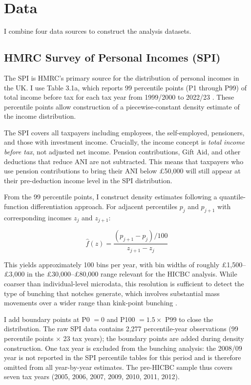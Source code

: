 \documentclass[12pt]{article}
\begin{document}
\section{Data}

I combine four data sources to construct the analysis datasets.

\subsection{HMRC Survey of Personal Incomes (SPI)}

The SPI is HMRC's primary source for the distribution of personal incomes in the UK. I use Table 3.1a, which reports 99 percentile points (P1 through P99) of total income before tax for each tax year from 1999/2000 to 2022/23 \citep{hmrc_spi2024}. These percentile points allow construction of a piecewise-constant density estimate of the income distribution.

The SPI covers all taxpayers including employees, the self-employed, pensioners, and those with investment income. Crucially, the income concept is \emph{total income before tax}, not adjusted net income. Pension contributions, Gift Aid, and other deductions that reduce ANI are not subtracted. This means that taxpayers who use pension contributions to bring their ANI below \pounds50,000 will still appear at their pre-deduction income level in the SPI distribution.

From the 99 percentile points, I construct density estimates following a quantile-function differentiation approach. For adjacent percentiles $p_j$ and $p_{j+1}$ with corresponding incomes $z_j$ and $z_{j+1}$:

\begin{equation}
    \hat{f}(z) = \frac{(p_{j+1} - p_j) / 100}{z_{j+1} - z_j}
    \label{eq:density}
\end{equation}

This yields approximately 100 bins per year, with bin widths of roughly \pounds1,500--\pounds3,000 in the \pounds30,000--\pounds80,000 range relevant for the HICBC analysis. While coarser than individual-level microdata, this resolution is sufficient to detect the type of bunching that notches generate, which involves substantial mass movements over a wider range than kink-point bunching \citep{kleven2016}.

I add boundary points at P0 $= 0$ and P100 $= 1.5 \times$ P99 to close the distribution. The raw SPI data contains 2,277 percentile-year observations (99 percentile points $\times$ 23 tax years); the boundary points are added during density construction. One tax year is excluded from the bunching analysis: the 2008/09 year is not reported in the SPI percentile tables for this period and is therefore omitted from all year-by-year estimates. The pre-HICBC sample thus covers seven tax years (2005, 2006, 2007, 2009, 2010, 2011, 2012).
\end{document}

